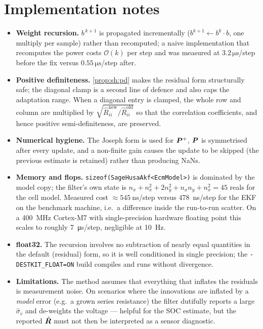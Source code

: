 \section{Implementation notes}
\label{sec:sh:impl}
\begin{itemize}[leftmargin=1.4em]
\item \textbf{Weight recursion.}  $b^{\,k+1}$ is propagated incrementally
      ($b^{k+1}\!\leftarrow\! b^{k}\cdot b$, one multiply per sample) rather than recomputed; a naive
      implementation that recomputes the power costs $\mathcal{O}(k)$ per step and was measured at
      $3.2\,\si{\micro\second}$/step before the fix versus $0.55\,\si{\micro\second}$/step after.
\item \textbf{Positive definiteness.}  \cref{prop:sh:pd} makes the residual form structurally safe;
      the diagonal clamp is a second line of defence and also caps the adaptation range.  When a
      diagonal entry is clamped, the whole row and column are multiplied by $\sqrt{\hat R^{\text{new}}_{ii}/\hat R^{\text{old}}_{ii}}$
      so that the correlation coefficients, and hence positive semi-definiteness, are preserved.
\item \textbf{Numerical hygiene.}  The Joseph form is used for $\bm{P}^{+}$, $\bm{P}$ is symmetrised after
      every update, and a non-finite gain causes the update to be skipped (the previous estimate is
      retained) rather than producing NaNs.
\item \textbf{Memory and flops.}  \texttt{sizeof(SageHusaAkf<EcmModel>)} is dominated by the model
      copy; the filter's own state is $n_x+n_x^2+2n_y^2+n_xn_y+n_x^2 = 45$ reals for the cell model.
      Measured cost $\approx\SI{545}{\nano\second}$/step versus \SI{478}{\nano\second}/step for the
      EKF on the benchmark machine, i.e.\ a difference inside the run-to-run scatter.  On a \SI{400}{\mega\hertz}
      Cortex-M7 with single-precision hardware floating point this scales to roughly
      \SI{7}{\micro\second}/step, negligible at \SI{10}{\hertz}.
\item \textbf{float32.}  The recursion involves no subtraction of nearly equal quantities in the
      default (residual) form, so it is well conditioned in single precision; the
      \texttt{-DESTKIT\_FLOAT=ON} build compiles and runs without divergence.
\item \textbf{Limitations.}  The method assumes that everything that inflates the residuals is
      measurement noise.  On scenarios where the innovations are inflated by a \emph{model} error
      (e.g.\ a grown series resistance) the filter dutifully reports a large $\hat\sigma_v$ and
      de-weights the voltage --- helpful for the SOC estimate, but the reported $\hat{\bm{R}}$ must not
      then be interpreted as a sensor diagnostic.
\end{itemize}

